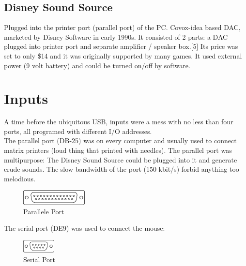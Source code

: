 \documentclass[book.tex]{subfiles}
\begin{document}
  \subsection{Disney Sound Source}
  Plugged into the printer port (parallel port) of the PC. Covox-idea based DAC, marketed by Disney Software in early 1990s. It consisted of 2 parts: a DAC plugged into printer port and separate amplifier / speaker box.[5] Its price was set to only \$14 and it was originally supported by many games. It used external power (9 volt battery) and could be turned on/off by software.\\
  \par
  \begin{figure}[H] 
    \centering 
  \end{figure}








\section{Inputs}
A time before the ubiquitous USB, inputs were a mess with no less than four ports, all programed with different I/O addresses.\\

The parallel port (DB-25) was on every computer and usually used to connect matrix printers (loud thing that printed with needles). The parallel port was multipurpose: The Disney Sound Source could be plugged into it and generate crude sounds. The slow bandwidth of the port (150 kbit/s) forbid anything too melodious.\\
 \begin{figure}[H]
\centering
\includegraphics[width=0.3\textwidth]{imgs/drawings/ports/DB-25_parallel_port.eps}
\caption{Parallele Port}
\label{fig:parallelPort}
\end{figure}


The serial port (DE9) was used to connect the mouse:
 \begin{figure}[H]
\centering
\includegraphics[width=0.15\textwidth]{imgs/drawings/ports/DE9_serial_port.eps}
\caption{Serial Port}
\label{fig:serialPort}
\end{figure}
\end{document}
